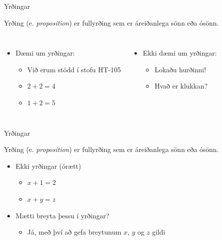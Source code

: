 \documentclass{beamer}
\begin{document}
\begin{frame}{Yrðingar}
\begin{tcolorbox}[title=Yrðing]
Yrðing (e. \emph{proposition}) er fullyrðing sem er áreiðanlega sönn eða ósönn.
\end{tcolorbox}
\begin{columns}
\begin{itemize}
 \item Dæmi um yrðingar:
 \begin{itemize}
  \item Við erum stödd í stofu HT-105
  \item $2 + 2 = 4$
  \item $1 + 2 = 5$
 \end{itemize}
\end{itemize}
\begin{itemize}
 \item Ekki dæmi um yrðingar:
 \begin{itemize}
  \item Lokaðu hurðinni!
  \item Hvað er klukkan?
 \end{itemize}
\end{itemize}
\end{columns}
\end{frame}

\begin{frame}{Yrðingar}
\begin{tcolorbox}[title=Yrðing]
Yrðing (e. \emph{proposition}) er fullyrðing sem er áreiðanlega sönn eða ósönn.
\end{tcolorbox}
\begin{itemize}
 \item Ekki yrðingar (órætt)
 \begin{itemize}
  \item $x + 1 = 2$
  \item $x + y = z$
 \end{itemize} \pause
 \item Mætti breyta þessu í yrðingar?\pause
 \begin{itemize}
  \item Já, með því að gefa breytunum $x$, $y$ og $z$ gildi
 \end{itemize}
\end{itemize}
\end{frame}
\end{document}
